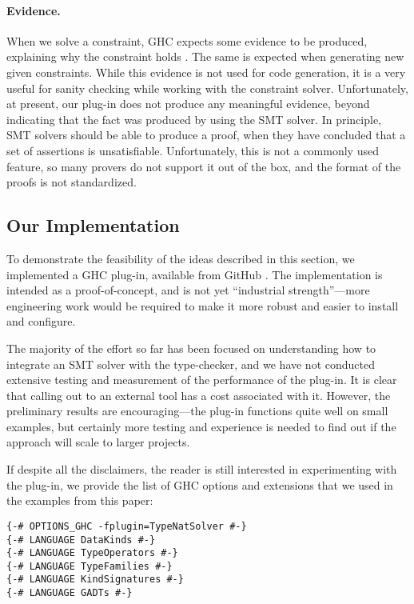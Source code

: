 \documentclass{sigplanconf}
\begin{document}
\paragraph{Evidence.} When we solve a constraint, GHC expects some
evidence to be produced, explaining why the constraint holds
\cite{fc-evidence}.  The same is expected when generating new given
constraints.  While this evidence is not used for code generation,
it is a very useful for sanity checking while working with the constraint
solver.  Unfortunately, at present, our plug-in does not produce any
meaningful evidence, beyond indicating that the fact was produced
by using the SMT solver. In principle, SMT solvers should be able to
produce a proof, when they have concluded that a set of assertions
is unsatisfiable.  Unfortunately, this is not a commonly used feature,
so many provers do not support it out of the box, and the format of the
proofs is not standardized.


\subsection{Our Implementation}
\label{implementation}

To demonstrate the feasibility of the ideas described in this section,
we implemented a GHC plug-in, available from GitHub \cite{type-nats-solver}.
The implementation is intended as a proof-of-concept, and is not
yet ``industrial strength''---more engineering work would be required
to make it more robust and easier to install and configure.

The majority of the effort so far has been focused on understanding how
to integrate an SMT solver with the type-checker, and we have not
conducted extensive testing and measurement of the performance of the plug-in.
It is clear that calling out to an external tool has a cost associated
with it.  However, the preliminary results are encouraging---the plug-in
functions quite well on small examples, but certainly more testing and
experience is needed to find out if the approach will scale to larger
projects.

If despite all the disclaimers, the reader is still interested in
experimenting with the plug-in, we provide the list of GHC options and
extensions that we used in the examples from this paper:

\begin{Verbatim}
{-# OPTIONS_GHC -fplugin=TypeNatSolver #-}
{-# LANGUAGE DataKinds #-}
{-# LANGUAGE TypeOperators #-}
{-# LANGUAGE TypeFamilies #-}
{-# LANGUAGE KindSignatures #-}
{-# LANGUAGE GADTs #-}
\end{Verbatim}
\end{document}
